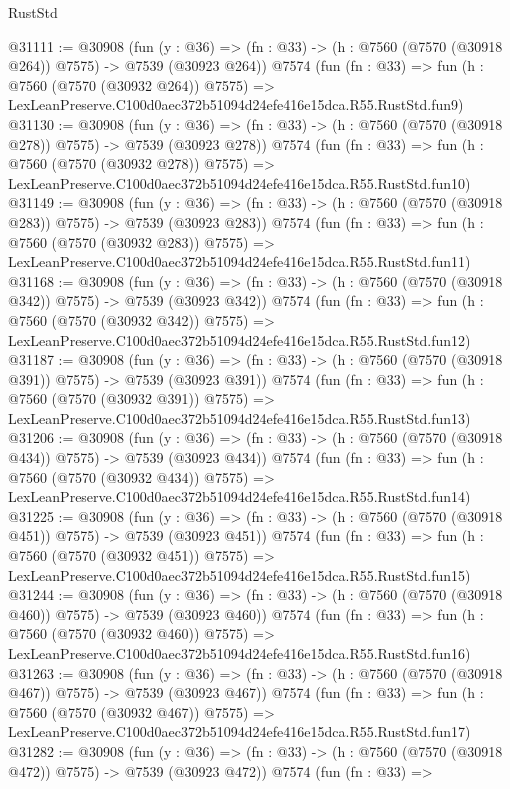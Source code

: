 \begin{lexlean}{RustStd}
\begin{coremodule}
@31111 := @30908
    (fun (y : @36) => (fn : @33) -> (h : @7560 (@7570 (@30918 @264)) @7575) -> @7539 (@30923 @264))
    @7574
    (fun (fn : @33) =>
    fun (h : @7560 (@7570 (@30932 @264)) @7575) =>
    LexLeanPreserve.C100d0aec372b51094d24efe416e15dca.R55.RustStd.fun9)
@31130 := @30908
    (fun (y : @36) => (fn : @33) -> (h : @7560 (@7570 (@30918 @278)) @7575) -> @7539 (@30923 @278))
    @7574
    (fun (fn : @33) =>
    fun (h : @7560 (@7570 (@30932 @278)) @7575) =>
    LexLeanPreserve.C100d0aec372b51094d24efe416e15dca.R55.RustStd.fun10)
@31149 := @30908
    (fun (y : @36) => (fn : @33) -> (h : @7560 (@7570 (@30918 @283)) @7575) -> @7539 (@30923 @283))
    @7574
    (fun (fn : @33) =>
    fun (h : @7560 (@7570 (@30932 @283)) @7575) =>
    LexLeanPreserve.C100d0aec372b51094d24efe416e15dca.R55.RustStd.fun11)
@31168 := @30908
    (fun (y : @36) => (fn : @33) -> (h : @7560 (@7570 (@30918 @342)) @7575) -> @7539 (@30923 @342))
    @7574
    (fun (fn : @33) =>
    fun (h : @7560 (@7570 (@30932 @342)) @7575) =>
    LexLeanPreserve.C100d0aec372b51094d24efe416e15dca.R55.RustStd.fun12)
@31187 := @30908
    (fun (y : @36) => (fn : @33) -> (h : @7560 (@7570 (@30918 @391)) @7575) -> @7539 (@30923 @391))
    @7574
    (fun (fn : @33) =>
    fun (h : @7560 (@7570 (@30932 @391)) @7575) =>
    LexLeanPreserve.C100d0aec372b51094d24efe416e15dca.R55.RustStd.fun13)
@31206 := @30908
    (fun (y : @36) => (fn : @33) -> (h : @7560 (@7570 (@30918 @434)) @7575) -> @7539 (@30923 @434))
    @7574
    (fun (fn : @33) =>
    fun (h : @7560 (@7570 (@30932 @434)) @7575) =>
    LexLeanPreserve.C100d0aec372b51094d24efe416e15dca.R55.RustStd.fun14)
@31225 := @30908
    (fun (y : @36) => (fn : @33) -> (h : @7560 (@7570 (@30918 @451)) @7575) -> @7539 (@30923 @451))
    @7574
    (fun (fn : @33) =>
    fun (h : @7560 (@7570 (@30932 @451)) @7575) =>
    LexLeanPreserve.C100d0aec372b51094d24efe416e15dca.R55.RustStd.fun15)
@31244 := @30908
    (fun (y : @36) => (fn : @33) -> (h : @7560 (@7570 (@30918 @460)) @7575) -> @7539 (@30923 @460))
    @7574
    (fun (fn : @33) =>
    fun (h : @7560 (@7570 (@30932 @460)) @7575) =>
    LexLeanPreserve.C100d0aec372b51094d24efe416e15dca.R55.RustStd.fun16)
@31263 := @30908
    (fun (y : @36) => (fn : @33) -> (h : @7560 (@7570 (@30918 @467)) @7575) -> @7539 (@30923 @467))
    @7574
    (fun (fn : @33) =>
    fun (h : @7560 (@7570 (@30932 @467)) @7575) =>
    LexLeanPreserve.C100d0aec372b51094d24efe416e15dca.R55.RustStd.fun17)
@31282 := @30908
    (fun (y : @36) => (fn : @33) -> (h : @7560 (@7570 (@30918 @472)) @7575) -> @7539 (@30923 @472))
    @7574
    (fun (fn : @33) =>

\end{coremodule}
\end{lexlean}
